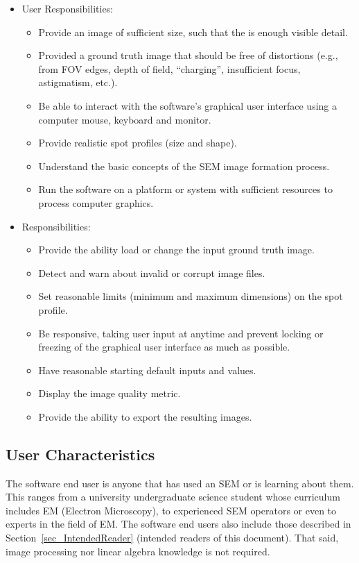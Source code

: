 \documentclass[12pt]{article}
\begin{document}
\begin{itemize}

  \item User Responsibilities:
  \begin{itemize}
    \item Provide an image of sufficient size, such that the is enough visible detail.
    \item Provided a ground truth image that should be free of distortions (e.g., from FOV edges, depth of field, ``charging'', insufficient focus, astigmatism, etc.).
    \item Be able to interact with the software's graphical user interface using a computer mouse, keyboard and monitor.
    \item Provide realistic spot profiles (size and shape).
    \item Understand the basic concepts of the SEM image formation process.
    \item Run the software on a platform or system with sufficient resources to process computer graphics.
  \end{itemize}

  \item \progname{} Responsibilities:
  \begin{itemize}
    \item Provide the ability load or change the input ground truth image.
    \item Detect and warn about invalid or corrupt image files.
    \item Set reasonable limits (minimum and maximum dimensions) on the spot profile. 
    \item Be responsive, taking user input at anytime and prevent locking or freezing of the graphical user interface as much as possible.
    \item Have reasonable starting default inputs and values.
    \item Display the image quality metric.
    \item Provide the ability to export the resulting images.
  \end{itemize}

\end{itemize}

\subsection{User Characteristics} \label{SecUserCharacteristics}

The \progname{} software end user is anyone that has used an SEM or is learning about them. 
This ranges from a university undergraduate science student whose curriculum includes 
EM (Electron Microscopy), to experienced SEM operators or even to experts in the field of EM. 
The software end users also include those described in Section~\ref{sec_IntendedReader} 
(intended readers of this document). That said, image processing nor linear algebra knowledge 
is not required. 
\end{document}
